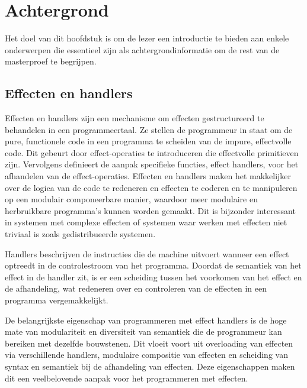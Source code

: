 \newtheorem{theorem}{Theorem}[section]
\newtheorem{lemma}[theorem]{Lemma}

\chapter{Achtergrond}
\label{hoofdstuk:achtergrond}
Het doel van dit hoofdstuk is om de lezer een introductie te bieden aan enkele onderwerpen die essentieel zijn als achtergrondinformatie om de rest van de masterproef te begrijpen.

\section{Effecten en handlers} \label{sec:achtergrondAlgEff}
Effecten en handlers \cite{Bauer2015} zijn een mechanisme om effecten gestructureerd te behandelen in een programmeertaal. Ze stellen de programmeur in staat om de pure, functionele code in een programma te scheiden van de impure, effectvolle code. Dit gebeurt door effect-operaties te introduceren die effectvolle primitieven zijn. Vervolgens definieert de aanpak specifieke functies, effect handlers, voor het afhandelen van de effect-operaties. Effecten en handlers maken het makkelijker over de logica van de code te redeneren en effecten te coderen en te manipuleren op een modulair componeerbare manier, waardoor meer modulaire en herbruikbare programma's kunnen worden gemaakt. Dit is bijzonder interessant in systemen met complexe effecten of systemen waar werken met effecten niet triviaal is zoals gedistribueerde systemen. \newline

Handlers beschrijven de instructies die de machine uitvoert wanneer een effect optreedt in de controlestroom van het programma. Doordat de semantiek van het effect in de handler zit, is er een scheiding tussen het voorkomen van het effect en de afhandeling, wat redeneren over en controleren van de effecten in een programma vergemakkelijkt. \newline

De belangrijkste eigenschap van programmeren met effect handlers is de hoge mate van modulariteit en diversiteit van semantiek die de programmeur kan bereiken met dezelfde bouwstenen. Dit vloeit voort uit overloading van effecten via verschillende handlers, modulaire compositie van effecten en scheiding van syntax en semantiek bij de afhandeling van effecten. Deze eigenschappen maken dit een veelbelovende aanpak voor het programmeren met effecten. 

